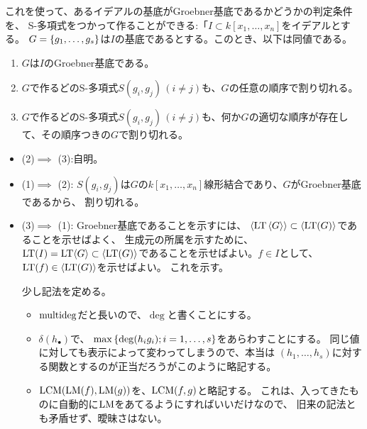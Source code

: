 \documentclass[9pt]{ltjsarticle}
\begin{document}
これを使って、あるイデアルの基底がGroebner基底であるかどうかの判定条件を、
S-多項式をつかって作ることができる:「$I\subset k[x_1,\dots,x_n]$をイデアルとする。
$G=\left\{g_1,\dots,g_s\right\}$は$I$の基底であるとする。このとき、以下は同値である。
\begin{enumerate}[label=(\arabic*)]
  \item $G$は$I$のGroebner基底である。
  \item $G$で作るどのS-多項式$S(g_i,g_j)\, (i\neq j)$も、$G$の任意の順序で割り切れる。
  \item $G$で作るどのS-多項式$S(g_i,g_j)\, (i\neq j)$も、何か$G$の適切な順序が存在して、その順序つきの$G$で割り切れる。
\end{enumerate}
\begin{myproof}
  \begin{itemize}
    \item (2)$\implies$ (3):自明。
    \item (1)$\implies$ (2):
    $S(g_i,g_j)$は$G$の$k[x_1,\dots,x_n]$線形結合であり、$G$がGroebner基底であるから、
    割り切れる。
    \item (3)$\implies$ (1):
    Groebner基底であることを示すには、
    $\left\langle {\rm LT}\left\langle G \right\rangle \right\rangle\subset \left\langle {\rm LT}(G) \right\rangle$であることを示せばよく、
    生成元の所属を示すために、${\rm LT}(I) = {\rm LT}{\left\langle G \right\rangle} \subset \left\langle {\rm LT}(G) \right\rangle$であることを示せばよい。$f\in I$として、${\rm LT}(f)\in \left\langle {\rm LT}(G) \right\rangle$を示せばよい。
    これを示す。

    少し記法を定める。
    \begin{itemize}
      \item $\mathrm{multideg}$だと長いので、$\deg$と書くことにする。
      \item $\delta(h_\bullet)$で、
      $\max\left\{\deg(h_ig_i) ; i=1,\dots,s\right\}$をあらわすことにする。
      同じ値に対しても表示によって変わってしまうので、本当は
      $(h_1,\dots,h_s)$に対する関数とするのが正当だろうがこのように略記する。
      \item $\mathrm{LCM}({\rm LM}(f),{\rm LM}(g))$を、$\mathrm{LCM}(f,g)$と略記する。
      これは、入ってきたものに自動的に${\rm LM}$をあてるようにすればいいだけなので、
      旧来の記法とも矛盾せず、曖昧さはない。
    \end{itemize}


\end{itemize}
\end{myproof}
\end{document}
